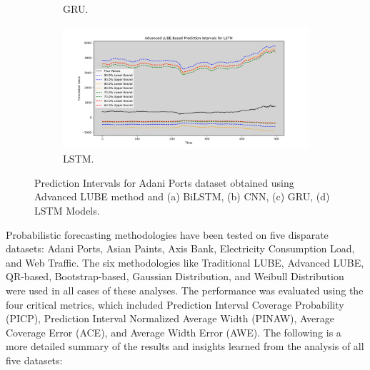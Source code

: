 \begin{figure}[H]
\begin{minipage}{0.6\textwidth}
\begin{subfigure}[b]{\textwidth}
                \caption{GRU.}
            \end{subfigure}
            \begin{subfigure}[b]{\textwidth}
                \centering
                \includegraphics[width=\textwidth]{Chap02/figs/LSTM_advanced_lube_plot_ADANIPORTS.png}
                \caption{LSTM.}
            \end{subfigure}
        \end{minipage}
    
    \caption{Prediction Intervals for Adani Ports dataset obtained using Advanced LUBE method and (a) BiLSTM, (b) CNN, (c) GRU, (d) LSTM Models.}
    \label{Fi 3.2}
\end{figure}

Probabilistic forecasting methodologies have been tested on five disparate datasets: Adani Ports, Asian Paints, Axis Bank, Electricity Consumption Load, and Web Traffic. The six methodologies like Traditional LUBE, Advanced LUBE, QR-based, Bootstrap-based, Gaussian Distribution, and Weibull Distribution were used in all cases of these analyses. The performance was evaluated using the four critical metrics, which included Prediction Interval Coverage Probability (PICP), Prediction Interval Normalized Average Width (PINAW), Average Coverage Error (ACE), and Average Width Error (AWE). The following is a more detailed summary of the results and insights learned from the analysis of all five datasets:


